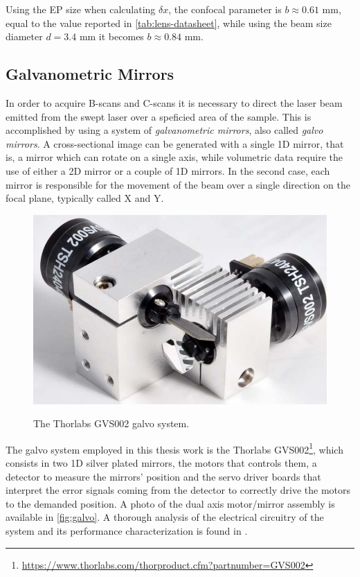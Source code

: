  
 Using the EP size when calculating $\delta x$, the confocal parameter is $b \approx 0.61$ mm, equal to the value reported in \autoref{tab:lens-datasheet}, while using the beam size diameter $d = 3.4$ mm it becomes $b \approx 0.84$ mm. 
 
 

\subsection{Galvanometric Mirrors}

In order to acquire B-scans and C-scans it is necessary to direct the laser beam emitted from the swept laser over a speficied area of the sample. This is accomplished by using a system of \emph{galvanometric mirrors}, also called \emph{galvo mirrors}. A cross-sectional image can be generated with a single 1D mirror, that is, a mirror which can rotate on a single axis, while volumetric data require the use of either a 2D mirror or a couple of 1D mirrors. In the second case, each mirror is responsible for the movement of the beam over a single direction on the focal plane, typically called X and Y. 

\begin{figure}[bth]
	\myfloatalign
	{\includegraphics[width=0.6\linewidth]{gfx/ch3/galvo}}
	\caption{The Thorlabs GVS002 galvo system.}\label{fig:galvo}
\end{figure}

The galvo system employed in this thesis work is the Thorlabs GVS002\footnote{\url{https://www.thorlabs.com/thorproduct.cfm?partnumber=GVS002}}, which consists in two 1D silver plated mirrors, the motors that controls them, a detector to measure the mirrors' position  and the servo driver boards that interpret the error signals coming from the detector to correctly drive the motors to the demanded position. A photo of the dual axis motor/mirror assembly is available in \autoref{fig:galvo}. A thorough analysis of the electrical circuitry of the system and its performance characterization is found in \cite{Calabrese2017}. 

